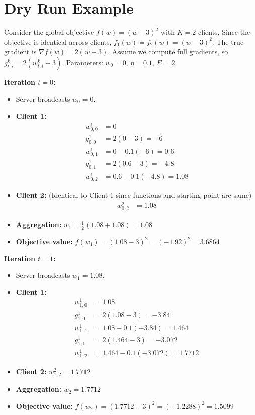 \documentclass{article}
\begin{document}
\section*{Dry Run Example}
Consider the global objective $f(w) = (w-3)^2$ with $K=2$ clients. 
Since the objective is identical across clients, $f_1(w) = f_2(w) = (w-3)^2$.
The true gradient is $\nabla f(w) = 2(w-3)$. 
Assume we compute full gradients, so $g_{t,i}^k = 2(w_{t,i}^k - 3)$.
Parameters: $w_0 = 0$, $\eta = 0.1$, $E = 2$.

\textbf{Iteration $t=0$:}
\begin{itemize}
    \item Server broadcasts $w_0 = 0$.
    \item \textbf{Client 1:}
    \begin{align*}
        w_{0,0}^1 &= 0 \\
        g_{0,0}^1 &= 2(0 - 3) = -6 \\
        w_{0,1}^1 &= 0 - 0.1(-6) = 0.6 \\
        g_{0,1}^1 &= 2(0.6 - 3) = -4.8 \\
        w_{0,2}^1 &= 0.6 - 0.1(-4.8) = 1.08
    \end{align*}
    \item \textbf{Client 2:} (Identical to Client 1 since functions and starting point are same)
    \begin{align*}
        w_{0,2}^2 &= 1.08
    \end{align*}
    \item \textbf{Aggregation:} $w_1 = \frac{1}{2}(1.08 + 1.08) = 1.08$
    \item \textbf{Objective value:} $f(w_1) = (1.08 - 3)^2 = (-1.92)^2 = 3.6864$
\end{itemize}

\textbf{Iteration $t=1$:}
\begin{itemize}
    \item Server broadcasts $w_1 = 1.08$.
    \item \textbf{Client 1:}
    \begin{align*}
        w_{1,0}^1 &= 1.08 \\
        g_{1,0}^1 &= 2(1.08 - 3) = -3.84 \\
        w_{1,1}^1 &= 1.08 - 0.1(-3.84) = 1.464 \\
        g_{1,1}^1 &= 2(1.464 - 3) = -3.072 \\
        w_{1,2}^1 &= 1.464 - 0.1(-3.072) = 1.7712
    \end{align*}
    \item \textbf{Client 2:} $w_{1,2}^2 = 1.7712$
    \item \textbf{Aggregation:} $w_2 = 1.7712$
    \item \textbf{Objective value:} $f(w_2) = (1.7712 - 3)^2 = (-1.2288)^2 = 1.5099$
\end{itemize}
\end{document}
